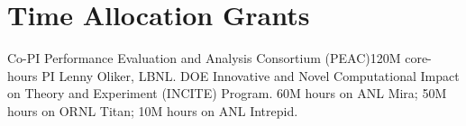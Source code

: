 \section{Time Allocation Grants}
		{Co-PI}
		{Performance Evaluation and Analysis Consortium (PEAC)}{}{120M core-hours}
		{PI Lenny Oliker, LBNL.  DOE
		 Innovative and Novel Computational Impact on Theory and Experiment (INCITE)
		 Program.  60M hours on ANL Mira; 50M hours on ORNL Titan;
		 10M hours on ANL Intrepid.}
